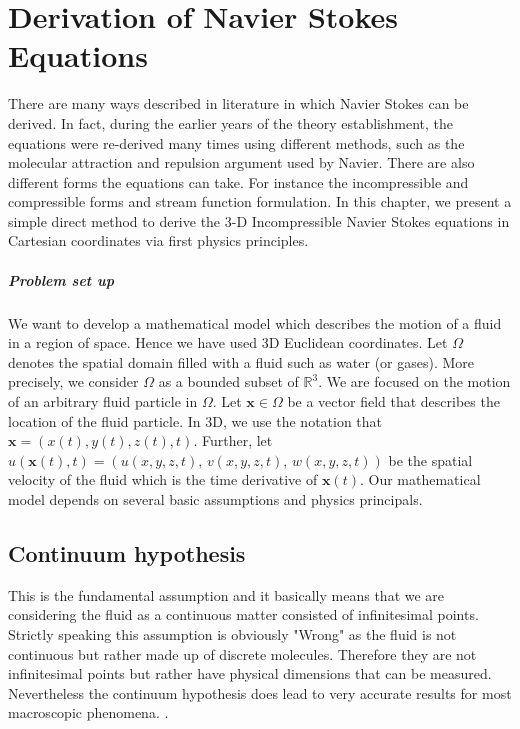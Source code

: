 \chapter{Derivation of Navier Stokes Equations}
\label{chapter2}
There are many ways described in literature in which Navier Stokes can be derived. In fact, during the earlier years of the theory establishment, the equations were re-derived many times using different methods, such as the molecular attraction and repulsion argument used by Navier. There are also different forms the equations can take. For instance the incompressible and compressible forms and stream function formulation. In this chapter, we present a simple direct method to derive the 3-D Incompressible Navier Stokes equations in Cartesian coordinates via first physics principles.\\

\paragraph*{Problem set up}
We want to develop a mathematical model which describes the motion of a fluid in a region of space. Hence we have used 3D Euclidean coordinates. Let $\Omega$ denotes the spatial domain filled with a fluid such as water (or gases). More precisely, we consider $\Omega$ as a bounded subset of $\mathbb{R}^3$. We are focused on the motion of an arbitrary fluid particle in $\Omega$. Let $\textbf{x} \in \Omega$ be a vector field that describes the location of the fluid particle. In 3D, we use the notation that $\textbf{x} = (x(t), y(t), z(t), t)$. Further, let $u(\textbf{x}(t), t) = \left( u(x,y,z,t),\,v(x,y,z,t),\,w(x,y,z,t)\right)$ be the spatial velocity of the fluid which is the time derivative of $\textbf{x}(t)$. Our mathematical model depends on several basic assumptions and physics principals.\\

\section{Continuum hypothesis}
This is the fundamental assumption and it basically means that we are considering the fluid as a continuous matter consisted of infinitesimal points. Strictly speaking this assumption is obviously "Wrong" as the fluid is not continuous but rather made up of discrete molecules. Therefore they are not infinitesimal points but rather have physical dimensions that can be measured. Nevertheless the continuum hypothesis does lead to very accurate results for most macroscopic phenomena. \cite{chorin1990mathematical}.\\

